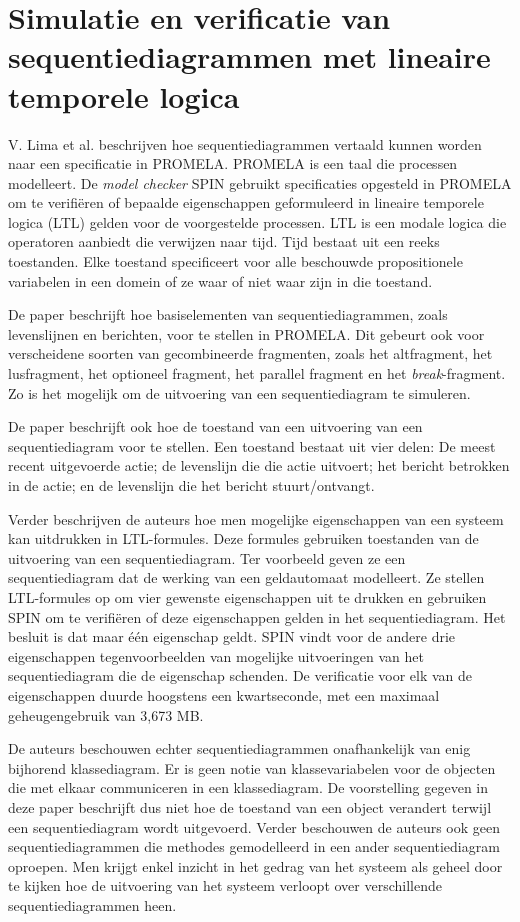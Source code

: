\section{Simulatie en verificatie van sequentiediagrammen met lineaire temporele logica}

V. Lima et al.\cite{LIMA2009143} beschrijven hoe sequentiediagrammen vertaald kunnen worden naar een specificatie in PROMELA\cite{neumann2014using}. PROMELA is een taal die processen modelleert. De \textit{model checker} SPIN\cite{holzmann2004spin} gebruikt specificaties opgesteld in PROMELA om te verifi\"eren of bepaalde eigenschappen geformuleerd in lineaire temporele logica (LTL) gelden voor de voorgestelde processen. LTL is een modale logica die operatoren aanbiedt die verwijzen naar tijd. Tijd bestaat uit een reeks toestanden. Elke toestand specificeert voor alle beschouwde propositionele variabelen in een domein of ze waar of niet waar zijn in die toestand.

De paper beschrijft hoe basiselementen van sequentiediagrammen, zoals levenslijnen en berichten, voor te stellen in PROMELA. Dit gebeurt ook voor verscheidene soorten van gecombineerde fragmenten, zoals het altfragment, het lusfragment, het optioneel fragment, het parallel fragment en het \textit{break}-fragment. Zo is het mogelijk om de uitvoering van een sequentiediagram te simuleren.

De paper beschrijft ook hoe de toestand van een uitvoering van een sequentiediagram voor te stellen. Een toestand bestaat uit vier delen: De meest recent uitgevoerde actie; de levenslijn die die actie uitvoert; het bericht betrokken in de actie; en de levenslijn die het bericht stuurt/ontvangt.

Verder beschrijven de auteurs hoe men mogelijke eigenschappen van een systeem kan uitdrukken in LTL-formules. Deze formules gebruiken toestanden van de uitvoering van een sequentiediagram. Ter voorbeeld geven ze een sequentiediagram dat de werking van een geldautomaat modelleert. Ze stellen LTL-formules op om vier gewenste eigenschappen uit te drukken en gebruiken SPIN om te verifi\"eren of deze eigenschappen gelden in het sequentiediagram. Het besluit is dat maar \'e\'en eigenschap geldt. SPIN vindt voor de andere drie eigenschappen tegenvoorbeelden van mogelijke uitvoeringen van het sequentiediagram die de eigenschap schenden. De verificatie voor elk van de eigenschappen duurde hoogstens een kwartseconde, met een maximaal geheugengebruik van 3,673 MB.

De auteurs beschouwen echter sequentiediagrammen onafhankelijk van enig bijhorend klassediagram. Er is geen notie van klassevariabelen voor de objecten die met elkaar communiceren in een klassediagram. De voorstelling gegeven in deze paper beschrijft dus niet hoe de toestand van een object verandert terwijl een sequentiediagram wordt uitgevoerd. Verder beschouwen de auteurs ook geen sequentiediagrammen die methodes gemodelleerd in een ander sequentiediagram oproepen. Men krijgt enkel inzicht in het gedrag van het systeem als geheel door te kijken hoe de uitvoering van het systeem verloopt over verschillende sequentiediagrammen heen.

